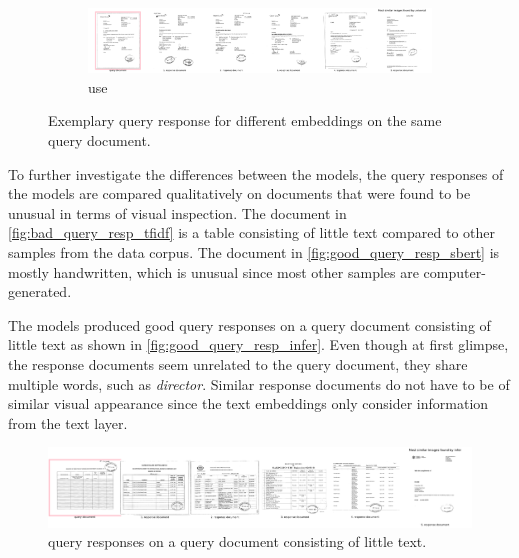 \begin{figure}[h!]
    \begin{subfigure}{\textwidth}
        \centering
        \includegraphics[width=1\textwidth]{images/query_results/4b4d0a9ee0c7283e5bfd69c402c73b2140bf90351c8f44d6809afe23c6dfaa50/Most_similar_images_found_by_universal.pdf}
        \caption{\ac{use}}
        \label{fig:query_resp_use}
    \end{subfigure}
\caption[Exemplary query response]{Exemplary query response for different embeddings on the same query document.}
\label{fig:query_resp}
\end{figure}

To further investigate the differences between the models, 
the query responses of the models are compared qualitatively on documents that were found to be unusual in terms of visual inspection.
The document in \autoref{fig:bad_query_resp_tfidf} is a table consisting of little text compared to other samples from the data corpus.
The document in \autoref{fig:good_query_resp_sbert} is mostly handwritten, which is unusual since most other samples are computer-generated.

The models produced good query responses on a query document consisting of little text as shown in \autoref{fig:good_query_resp_infer}.
Even though at first glimpse, the response documents seem unrelated to the query document, they share multiple words, such as \textit{director}.
Similar response documents do not have to be of similar visual appearance since the text embeddings only consider information from the text layer.

\begin{figure}[!htb] %
    \centering
    \includegraphics[width=1\textwidth]{images/query_results/42b7e56855c88c22ed01f381167e6f0887815e1ef7ea6b149be06ee1f8557b9e/Most_similar_images_found_by_infer.pdf}
    \caption[\infersent{} query responses]{\infersent{} query responses on a query document consisting of little text.
    }
    \label{fig:good_query_resp_infer}
\end{figure}


